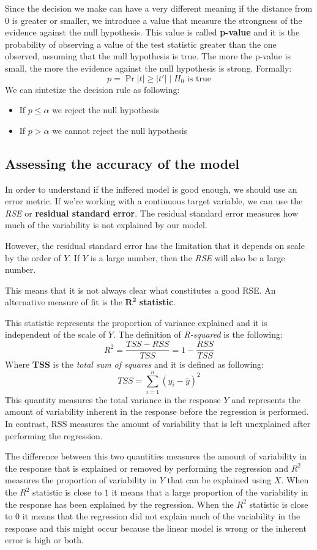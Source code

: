 Since the decision we make can have a very different meaning if the distance from 0 is greater or smaller, we introduce a value that measure the strongness of the evidence against the null hypothesis. This value is called \textbf{p-value} and it is the probability of observing a value of the test statistic greater than the one observed, assuming that the null hypothesis is true. The more the p-value is small, the more the evidence against the null hypothesis is strong. Formally:
\[
    p = \Pr{|t| \geq |t'|    \mid H_0 \text{ is true}}
\]
We can sintetize the decision rule as following:
\begin{itemize}
    \item If $p \leq \alpha$ we reject the null hypothesis
    \item If $p > \alpha$ we cannot reject the null hypothesis
\end{itemize}
\subsection{Assessing the accuracy of the model}
In order to understand if the inffered model is good enough, we should use an error metric. If we're working with a continuous target variable, we can use the \textit{RSE} or \textbf{residual standard error}. The residual standard error measures how much of the variability is not explained by our model.

However, the residual standard error has the limitation that it depends on scale by the order of $Y$. If $Y$ is a large number, then the \textit{RSE} will also be a large number.

This means that it is not always clear what constitutes a good RSE. An alternative measure of fit is the $\mathbf{R^2}$ \textbf{statistic}.

This statistic represents the proportion of variance explained and it is independent of the scale of $Y$. The definition of \textit{R-squared} is the following:
\[
    R^2 = \frac{TSS - RSS}{TSS} = 1 - \frac{RSS}{TSS}
\]
Where \textbf{TSS} is the \textit{total sum of squares} and it is defined as following:
\[
    TSS = \sum_{i=1}^{n} (y_i - \overline{y})^2
\]
This quantity measures the total variance in the response $Y$ and represents the amount of variability inherent in the response before the regression is performed. In contrast, RSS measures the amount of variability that is left unexplained after performing the regression.

The difference between this two quantities measures the amount of variability in the response that is explained or removed by performing the regression and $R^2$ measures the proportion of variability in $Y$ that can be explained using $X$.
When the $R^2$ statistic is close to $1$ it means that a large proportion of the variability in the response has been explained by the regression.
When the $R^2$ statistic is close to $0$ it means that the regression did not explain much of the variability in the response and this might occur because the linear model is wrong or the inherent error is high or both.

